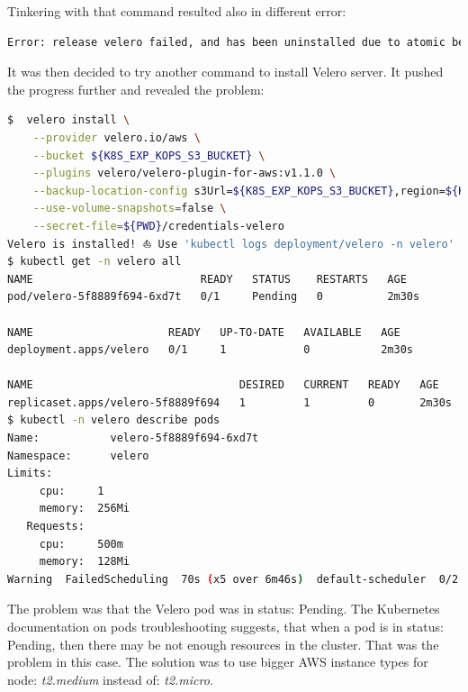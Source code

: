 Tinkering with that command resulted also in different error:
\begin{lstlisting}[basicstyle=\tiny,caption={TODO},captionpos=b,language=Bash,xleftmargin=1cm]
Error: release velero failed, and has been uninstalled due to atomic being set: timed out waiting for the condition
\end{lstlisting}

It was then decided to try another command to install Velero server. It pushed the progress further and revealed the problem:
\begin{lstlisting}[basicstyle=\tiny,caption={TODO},captionpos=b,language=Bash,xleftmargin=1cm]
$  velero install \
    --provider velero.io/aws \
    --bucket ${K8S_EXP_KOPS_S3_BUCKET} \
    --plugins velero/velero-plugin-for-aws:v1.1.0 \
    --backup-location-config s3Url=${K8S_EXP_KOPS_S3_BUCKET},region=${K8S_EXP_REGION} \
    --use-volume-snapshots=false \
    --secret-file=${PWD}/credentials-velero
Velero is installed! ⛵ Use 'kubectl logs deployment/velero -n velero' to view the status.
$ kubectl get -n velero all
NAME                          READY   STATUS    RESTARTS   AGE
pod/velero-5f8889f694-6xd7t   0/1     Pending   0          2m30s

NAME                     READY   UP-TO-DATE   AVAILABLE   AGE
deployment.apps/velero   0/1     1            0           2m30s

NAME                                DESIRED   CURRENT   READY   AGE
replicaset.apps/velero-5f8889f694   1         1         0       2m30s
$ kubectl -n velero describe pods
Name:           velero-5f8889f694-6xd7t
Namespace:      velero
Limits:
     cpu:     1
     memory:  256Mi
   Requests:
     cpu:     500m
     memory:  128Mi
Warning  FailedScheduling  70s (x5 over 6m46s)  default-scheduler  0/2 nodes are available: 2 Insufficient cpu.
\end{lstlisting}

The problem was that the Velero pod was in status: Pending. The Kubernetes documentation on pods troubleshooting suggests, that when a pod is in status: Pending, then there may be not enough resources in the cluster\cite{k8s-deb}. That was the problem in this case. The solution was to use bigger AWS instance types for node: \textit{t2.medium} instead of: \textit{t2.micro}.

